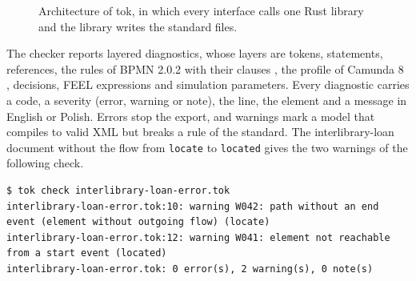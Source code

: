 \documentclass[11pt,a4paper]{article}
\begin{document}
\begin{figure}[t]
\centering
{}
\caption{Architecture of tok, in which every interface calls one Rust library and the library writes the standard files.}\label{fig:architecture}
\end{figure}

The checker reports layered diagnostics, whose layers are tokens, statements, references, the rules of BPMN 2.0.2 with their clauses \citep{OMG2014BPMN}, the profile of Camunda 8 \citep{Camunda8}, decisions, FEEL expressions \citep{OMG2024DMN} and simulation parameters. Every diagnostic carries a code, a severity (error, warning or note), the line, the element and a message in English or Polish. Errors stop the export, and warnings mark a model that compiles to valid XML but breaks a rule of the standard. The interlibrary-loan document without the flow from \texttt{locate} to \texttt{located} gives the two warnings of the following check.

\begin{lstlisting}
$ tok check interlibrary-loan-error.tok
interlibrary-loan-error.tok:10: warning W042: path without an end event (element without outgoing flow) (locate)
interlibrary-loan-error.tok:12: warning W041: element not reachable from a start event (located)
interlibrary-loan-error.tok: 0 error(s), 2 warning(s), 0 note(s)
\end{lstlisting}
\end{document}
